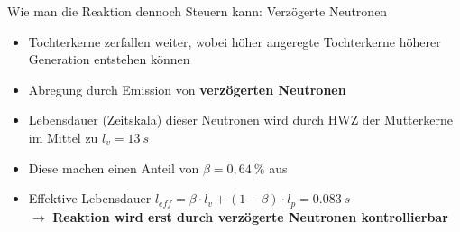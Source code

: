 \documentclass[10pt]{beamer}
\begin{document}
		\begin{frame}{Wie man die Reaktion dennoch Steuern kann: Verzögerte Neutronen}
			\begin{itemize}
				\item Tochterkerne zerfallen weiter, wobei höher angeregte Tochterkerne höherer Generation entstehen können
				\item Abregung durch Emission von \textbf{verzögerten Neutronen}
				\item Lebensdauer (Zeitskala) dieser Neutronen wird durch HWZ der Mutterkerne im Mittel zu $l_v = 13\ \unit{s}$
				\item Diese machen einen Anteil von $\beta = 0,64\ \unit{\%}$ aus
				\item Effektive Lebensdauer $l_{eff} = \beta \cdot l_v + (1-\beta) \cdot l_p = 0.083\ \unit{s}$\\
				$\rightarrow$ \textbf{Reaktion wird erst durch verzögerte Neutronen kontrollierbar}
			\end{itemize}	
		\end{frame}
		
\end{document}
